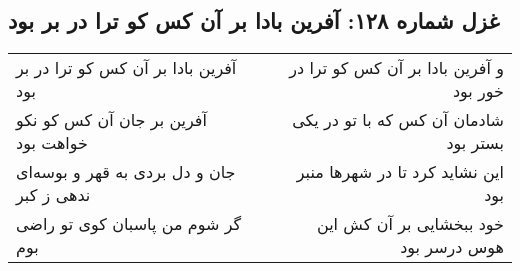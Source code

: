 \begin{center}
\section*{غزل شماره ۱۲۸: آفرین بادا بر آن کس کو ترا در بر بود}
\label{sec:128}
\begin{longtable}{l p{0.5cm} r}
آفرین بادا بر آن کس کو ترا در بر بود
&&
و آفرین بادا بر آن کس کو ترا در خور بود
\\
آفرین بر جان آن کس کو نکو خواهت بود
&&
شادمان آن کس که با تو در یکی بستر بود
\\
جان و دل بردی به قهر و بوسه‌ای ندهی ز کبر
&&
این نشاید کرد تا در شهرها منبر بود
\\
گر شوم من پاسبان کوی تو راضی بوم
&&
خود ببخشایی بر آن کش این هوس درسر بود
\\
\end{longtable}
\end{center}
